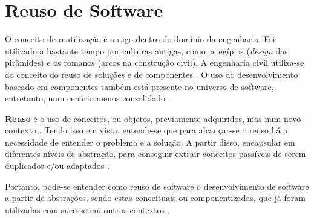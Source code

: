 \section{Reuso de Software}
O conceito de reutilização é antigo dentro do domínio da engenharia. Foi utilizado a bastante tempo por culturas antigas, como os egípios (\textit{design} das pirâmides) e os romanos (arcos na construção civil). A engenharia civil utiliza-se do conceito do reuso de soluções e de componentes \cite{sutcliffe2002}. O uso do desenvolvimento baseado em componentes também está presente no universo de software, entretanto, num cenário menos consolidado \cite{sutcliffe2002}.
\par
\indent \textbf{Reuso} é o uso de conceitos, ou objetos, previamente adquiridos, mas num novo contexto \cite{sutcliffe2002}. Tendo isso em vista, entende-se que para alcançar-se o reuso há a necessidade de entender o problema e a solução. A partir disso, encapsular em diferentes níveis de abstração, para conseguir extrair conceitos passíveis de serem duplicados e/ou adaptados \cite{sutcliffe2002}.
\par
\indent Portanto, pode-se entender como reuso de software o desenvolvimento de software a partir de abstrações, sendo estas conceituais ou componentizadas, que já foram utilizadas com sucesso em outros contextos \cite{sutcliffe2002}.

